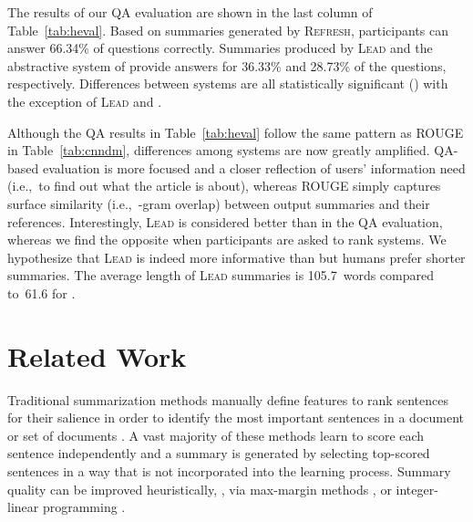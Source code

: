 \documentclass[11pt,a4paper]{article}
\newcommand\refresh{\textsc{Refresh}}
\begin{document}
The results of our QA evaluation are shown in the last column of
Table~\ref{tab:heval}. Based on summaries generated by \refresh,
participants can answer 66.34\% of questions correctly. Summaries
produced by \textsc{Lead} and the abstractive system of
 provide answers for 36.33\% and 28.73\% of the
questions, respectively. Differences between systems are all
statistically significant (\mbox{}) with the exception of
\textsc{Lead} and .


Although the QA results in Table~\ref{tab:heval} follow the same
pattern as ROUGE in Table~\ref{tab:cnndm}, differences among systems
are now greatly amplified. QA-based evaluation is more focused and a
closer reflection of users' information need (i.e.,~to find out what
the article is about), whereas ROUGE simply captures surface
similarity (i.e.,~\mbox{-gram} overlap) between output summaries
and their references.  Interestingly, \textsc{Lead} is considered
better than  in the QA evaluation, whereas we find
the opposite when participants are asked to rank systems. We
hypothesize that \textsc{Lead} is indeed more informative than
 but humans prefer shorter summaries. The average
length of \textsc{Lead} summaries is 105.7~words compared to~61.6 for
.






\section{Related Work}


Traditional summarization methods manually define features to rank
sentences for their salience in order to identify the most important
sentences in a document or set of documents
\cite{Kupiec:1995binary,mani2001automatic,radev-lrec2004,filatova-04event,nenkova-06,SparckJones:2007}.
A vast majority of these methods learn to score each sentence
independently
\cite{Barzilay97usinglexical,Teufel97sentenceextraction,erkan:2004:lexrank,Mihalcea04TextRank,Shen:2007:IJCAI,Schilder:2008:fastsum,Wan:2010:urank}
and a summary is generated by selecting top-scored sentences in a way
that is not incorporated into the learning process. Summary quality
can be improved heuristically, \cite{Yih:2007:MSM}, via max-margin
methods \cite{Carbonell:1998:UMD,Li:2009:EDC}, or integer-linear
programming
\cite{woodsend-acl10,berg:2011,Woodsend:2012:emnlp,Almeida:acl13,parveen:2015:tgraph}. 
\end{document}
